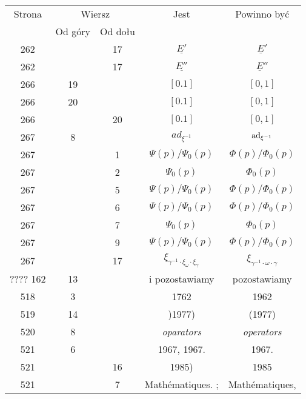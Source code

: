 \documentclass[a4paper,11pt]{article}
\begin{document}
\begin{center}
  \begin{tabular}{|c|c|c|c|c|}
    \hline
    Strona & \multicolumn{2}{c|}{Wiersz} & Jest
                              & Powinno być \\ \cline{2-3}
    & Od góry & Od dołu & & \\
    \hline
    262 & & 17 & $\underline{ E' }$ & $\underline{ E }'$ \\
    262 & & 17 & $\underline{ E'' }$ & $\underline{ E }''$ \\
    266 & 19 & & $[ 0. 1 ]$ & $[ 0, 1 ]$ \\
    266 & 20 & & $[ 0. 1 ]$ & $[ 0, 1 ]$ \\
    266 & & 20 & $[ 0. 1 ]$ & $[ 0, 1 ]$ \\
    267 & \hphantom{0}8 & & $ad_{ \xi^{ -1 } }$ & $\mathrm{ad}_{ \xi^{ -1 } }$ \\
    267 & & \hphantom{0}1 & $\Psi( p ) / \Psi_{ 0 }( p )$
    & $\Phi( p ) / \Phi_{ 0 }( p )$ \\
    267 & & \hphantom{0}2 & $\Psi_{ 0 }( p )$ & $\Phi_{ 0 }( p )$ \\
    267 & & \hphantom{0}5 & $\Psi( p ) / \Psi_{ 0 }( p )$
    & $\Phi( p ) / \Phi_{ 0 }( p )$ \\
    267 & & \hphantom{0}6 & $\Psi( p ) / \Psi_{ 0 }( p )$
    & $\Phi( p ) / \Phi_{ 0 }( p )$ \\
    267 & & \hphantom{0}7 & $\Psi_{ 0 }( p )$ & $\Phi_{ 0 }( p )$ \\
    267 & & \hphantom{0}9 & $\Psi( p ) / \Psi_{ 0 }( p )$
    & $\Phi( p ) / \Phi_{ 0 }( p )$ \\
    267 & & 17 & $\xi_{ \gamma^{ - 1 } \cdot \xi_{ \omega } \cdot \xi_{ \gamma } }$
    & $\xi_{ \gamma^{ - 1 } \cdot \omega \cdot \gamma }$ \\
    ???? 162 & 13 & & i pozostawiamy & pozostawiamy \\
    518 & \hphantom{0}3 & & 1762 & 1962 \\
    519 & 14 & & )1977) & (1977) \\
    520 & \hphantom{0}8 & & \textit{oparators} & \textit{operators} \\
    521 & \hphantom{0}6 & & 1967, 1967. & 1967. \\
    521 & & 16 & 1985) & 1985 \\
    521 & & \hphantom{0}7 & Math\'{e}matiques. ; & Math\'{e}matiques, \\
    \hline
  \end{tabular}






\end{center}
\end{document}
